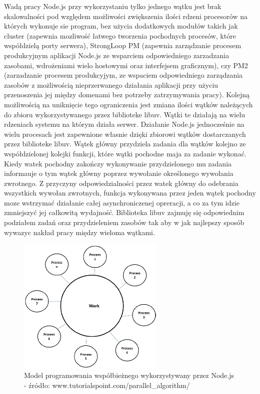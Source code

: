 \documentclass[12pt]{report}
\begin{document}
Wadą pracy Node.js przy wykorzystaniu tylko jednego wątku jest brak skalowalności pod względem możliwości zwiększenia ilości rdzeni procesorów na których wykonuje sie program, bez użycia dodatkowych modułów takich jak cluster (zapewnia mozliwość latwego tworzenia pochodnych procesów, które współdzielą porty serwera), StrongLoop PM (zapewnia zarządzanie procesem produkcyjnym aplikacji Node.js ze wsparciem odpowiedniego zarzadzania zasobami, wdrożeniami wielo hostowymi oraz interfejsem graficznym), czy PM2 (zarzadzanie procesem produkcyjym, ze wspaciem odpowiedniego zarządzania zasobów z możliwością nieprzerwanego działania aplikacji przy użyciu przenoszenia jej między domenami bez potrzeby zatrzymywania pracy). 
Kolejną możliwością na uniknięcie tego ograniczenia jest zmiana ilości wątków należących do zbioru wykorzystywanego przez biblioteke libuv. 
Wątki te działają na wielu rdzeniach systemu na którym działa serwer. 
Działanie Node.js jednocześnie na wielu procesach jest zapewnione własnie dzięki zbiorowi wątków dostarczanych przez biblioteke libuv.
Wątek główny przydziela zadania dla wątków kolejno ze współdzielonej kolejki funkcji, które wątki pochodne maja za zadanie wykonać. 
Kiedy watek pochodny zakończy wykonywanie przydzielonego mu zadania informauje o tym wątek główny poprzez wywołanie określonego wywołania zwrotnego. 
Z przyczyny odpowiedzialności przez watek główny do odebrania wszystkich wywołan zwrotnych, funkcja wykonywana przez jeden wątek pochodny moze wstrzymać działanie całej asynchroniczenej opreracji, a co za tym idzie zmniejszyć jej całkowitą wydajność. 
Biblioteka libuv zajmuję się odpowiednim podziałem zadań oraz przydzieleniem zasobów tak aby w jak najlepszy sposób wywazyc nakład pracy między wieloma wątkami. 

\begin{figure}[!t]
\centering
\includegraphics[width=7cm]{thread.png} 
\caption{Model programowania współbieżnego wykorzystywany przez Node.js - źródło: www.tutorialspoint.com/parallel_algorithm/}
\end{figure}
\end{document}
